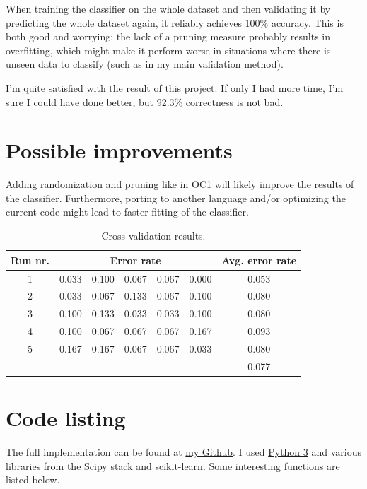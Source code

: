 \documentclass[12pt]{article}
\begin{document}
When training the classifier on the whole dataset and then validating it by predicting the whole dataset again, it reliably achieves 100\% accuracy. This is both good and worrying; the lack of a pruning measure probably results in overfitting, which might make it perform worse in situations where there is unseen data to classify (such as in my main validation method).

I'm quite satisfied with the result of this project. If only I had more time, I'm sure I could have done better, but 92.3\% correctness is not bad.

\section{Possible improvements}
Adding randomization and pruning like in OC1 will likely improve the results of the classifier. Furthermore, porting to another language and/or optimizing the current code might lead to faster fitting of the classifier.

\begin{table}[!ht]
\centering
\begin{tabular}{c|cccccc}
Run nr. & \multicolumn{5}{c}{Error rate} & Avg. error rate \\ \hline
1 & 0.033 & 0.100 & 0.067 & 0.067 & 0.000 & 0.053 \\
2 & 0.033 & 0.067 & 0.133 & 0.067 & 0.100 & 0.080 \\
3 & 0.100 & 0.133 & 0.033 & 0.033 & 0.100 & 0.080 \\
4 & 0.100 & 0.067 & 0.067 & 0.067 & 0.167 & 0.093 \\
5 & 0.167 & 0.167 & 0.067 & 0.067 & 0.033 & 0.080 \\ \hline
~ & ~     & ~     & ~     & ~     & ~     & 0.077
\end{tabular}
\caption{Cross-validation results.}
\label{tab:cvresults}
\end{table}

\appendix
\section{Code listing} \label{app:code}
The full implementation can be found at \href{http://github.com/KDercksen/pyblique}{my Github}. I used \href{http://www.python.org}{Python 3} and various libraries from the \href{http://www.scipy.org}{Scipy stack} and \href{http://www.scikit-learn.org}{scikit-learn}. Some interesting functions are listed below.
\end{document}
